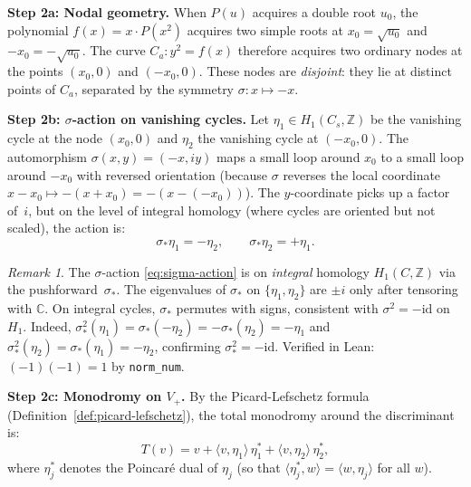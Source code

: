 \documentclass[11pt]{article}
\theoremstyle{plain}
\theoremstyle{definition}
\theoremstyle{remark}
\newtheorem{remark}[theorem]{Remark}
\newcommand{\ZZ}{\mathbb{Z}}
\newcommand{\CC}{\mathbb{C}}
\begin{document}
\textbf{Step 2a: Nodal geometry.}
When $P(u)$ acquires a double root $u_0$, the polynomial
$f(x) = x\cdot P(x^2)$ acquires two simple roots at $x_0 = \sqrt{u_0}$
and $-x_0 = -\sqrt{u_0}$.  The curve $C_a: y^2 = f(x)$ therefore
acquires two ordinary nodes at the points $(x_0, 0)$ and $(-x_0, 0)$.
These nodes are \emph{disjoint}: they lie at distinct points of $C_a$,
separated by the symmetry $\sigma: x \mapsto -x$.

\textbf{Step 2b: $\sigma$-action on vanishing cycles.}
Let $\eta_1 \in H_1(C_s, \ZZ)$ be the vanishing cycle at the node $(x_0, 0)$
and $\eta_2$ the vanishing cycle at $(-x_0, 0)$.  The automorphism
$\sigma(x,y) = (-x, iy)$ maps a small loop around $x_0$ to a small loop
around $-x_0$ with reversed orientation (because $\sigma$ reverses the
local coordinate $x - x_0 \mapsto -(x + x_0) = -(x - (-x_0))$).
The $y$-coordinate picks up a factor of~$i$, but on the level of
integral homology (where cycles are oriented but not scaled), the action is:
\begin{equation}\label{eq:sigma-action}
  \sigma_*\eta_1 = -\eta_2, \qquad \sigma_*\eta_2 = +\eta_1.
\end{equation}

\begin{remark}\label{rmk:integral}
  The $\sigma$-action \eqref{eq:sigma-action} is on \emph{integral} homology
  $H_1(C, \ZZ)$ via the pushforward~$\sigma_*$.  The eigenvalues of $\sigma_*$
  on $\{\eta_1, \eta_2\}$ are $\pm i$ only after tensoring with $\CC$.
  On integral cycles, $\sigma_*$ permutes with signs, consistent with
  $\sigma^2 = -\mathrm{id}$ on $H_1$.  Indeed, $\sigma_*^2(\eta_1)
  = \sigma_*(-\eta_2) = -\sigma_*(\eta_2) = -\eta_1$ and
  $\sigma_*^2(\eta_2) = \sigma_*(\eta_1) = -\eta_2$, confirming
  $\sigma_*^2 = -\mathrm{id}$.  Verified in Lean: $(-1)(-1) = 1$
  by \texttt{norm\_num}.
\end{remark}

\textbf{Step 2c: Monodromy on $V_+$.}
By the Picard-Lefschetz formula (Definition~\ref{def:picard-lefschetz}), the
total monodromy around the discriminant is:
\[
  T(v) = v + \langle v, \eta_1\rangle\, \eta_1^* + \langle v, \eta_2\rangle\, \eta_2^*,
\]
where $\eta_j^*$ denotes the Poincar\'{e} dual of $\eta_j$ (so that
$\langle \eta_j^*, w\rangle = \langle w, \eta_j\rangle$ for all $w$).
\end{document}
